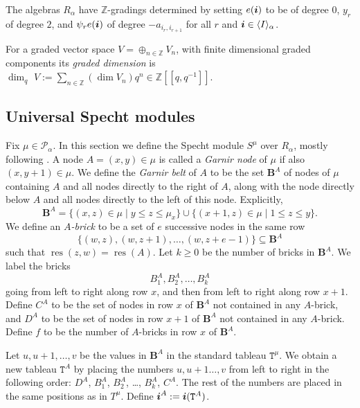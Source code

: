 \documentclass[twoside,11pt,reqno,letter]{amsart}
\numberwithin{equation}{section}
\theoremstyle{definition}  %
\def\bi{\text{\boldmath$i$}}
\newcommand{\words}{\langle I \rangle}
\def\qdim{{\operatorname{dim}_q}\,}
\newcommand{\res}{\operatorname{res}}
\newcommand{\Z}{\mathbb{Z}}
\newcommand{\0}{{\bar 0}}
\newcommand{\1}{{\bar 1}}
\newcommand{\La}{\Lambda}
\newcommand{\al}{\alpha}
\def\Belt{\mathbf{B}}
\newcommand\Par{\mathscr P}
\def\T{{\mathtt T}}
\def\G{{\mathtt G}}
\renewcommand\O{\mathcal O}
\begin{document}
The algebras $R_\al$ have $\Z$-gradings determined by setting 
$e(\bi)$ to be of degree 0,
$y_r$ of degree $2$, and
$\psi_r e(\bi)$ of degree $-a_{i_r,i_{r+1}}$
for all $r$ and $\bi \in \words_\al$.

For a graded vector space $V=\oplus_{n\in \Z} V_n$, with finite dimensional graded components its {\em graded dimension} is $\qdim \, V:=\sum_{n \in \Z}  (\dim V_n)q^n\in\Z[[q,q^{-1}]]$.









\subsection{Universal Specht modules}\label{SecSpecht}
Fix $\mu \in \Par_\al$. In this section we define the Specht module $S^\mu$ over $R_\al$, mostly following \cite{KMR}. A node $A=(x,y) \in \mu$ is called a \emph{Garnir node} of $\mu$ if also $(x,y+1) \in \mu$. We define the \emph{Garnir belt} of $A$ to be the set $\Belt^A$ of nodes of $\mu$ containing $A$ and all nodes directly to the right of $A$, along with the node directly below $A$ and all nodes directly to the left of this node. Explicitly,
$$\Belt^A = \{(x, z) \in \mu \mid y \leq z \leq \mu_x\} \cup \{(x+1, z) \in \mu \mid 1 \leq z \leq y\}.$$
We define an \emph{$A$-brick} to be a set of $e$ successive nodes in the same row
$$\{(w,z), (w,z+1),\dots,(w,z+e-1)\} \subseteq \Belt^A$$
such that $\res(z,w) = \res(A)$. Let $k \geq 0$ be the number of bricks in $\Belt^A$. We label the bricks
$$B^A_1, B^A_2, \dots, B^A_k$$
going from left to right along row $x$, and then from left to right along row $x+1$. Define $C^A$ to be the set of nodes in row $x$ of $\Belt^A$ not contained in any $A$-brick, and $D^A$ to be the set of nodes in row $x+1$ of $\Belt^A$ not contained in any $A$-brick. 
Define $f$ to be the number of $A$-bricks in row $x$ of $\Belt^A$. %


Let $u, u+1, \dots, v$ be the values in $\Belt^A$ in the standard tableau $\T^\mu$. We obtain a new tableau $\T^A$ by placing the numbers $u, u+1 \dots, v$ from left to right in the following order: $D^A$, $B^A_1$, $B^A_2$, \dots, $B^A_k$, $C^A$. The rest of the numbers are placed in the same positions as in $T^\mu$. Define $\bi^A := \bi(\T^A)$.
\end{document}
